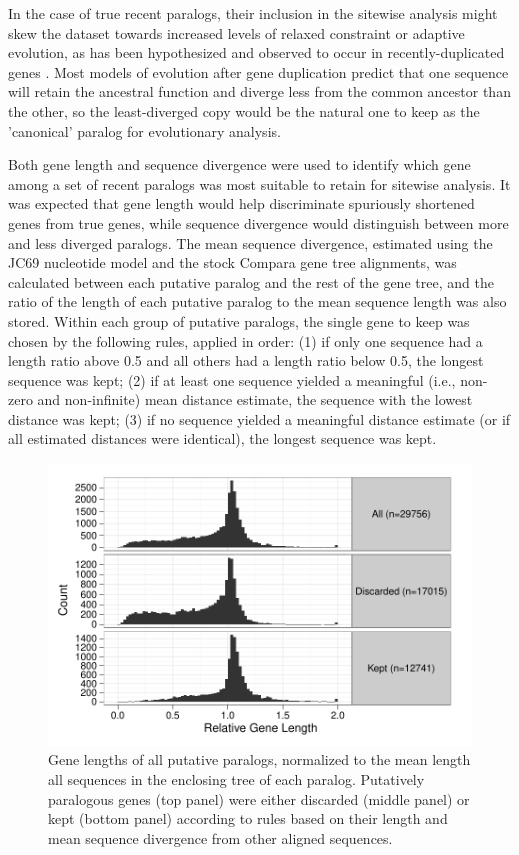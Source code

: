 In the case of true recent paralogs, their inclusion in the sitewise
analysis might skew the dataset towards increased levels of relaxed
constraint or adaptive evolution, as has been hypothesized and
observed to occur in recently-duplicated genes \citep{Lynch2000}. Most
models of evolution after gene duplication predict that one sequence
will retain the ancestral function and diverge less from the common
ancestor than the other, so the least-diverged copy would be the
natural one to keep as the 'canonical' paralog for evolutionary
analysis.

Both gene length and sequence divergence were used to identify which
gene among a set of recent paralogs was most suitable to retain for
sitewise analysis. It was expected that gene length would help
discriminate spuriously shortened genes from true genes, while
sequence divergence would distinguish between more and less diverged
paralogs. The mean sequence divergence, estimated using the JC69
nucleotide model and the stock Compara gene tree alignments, was
calculated between each putative paralog and the rest of the gene
tree, and the ratio of the length of each putative paralog to the mean
sequence length was also stored. Within each group of putative
paralogs, the single gene to keep was chosen by the following rules,
applied in order: (1) if only one sequence had a length ratio above
0.5 and all others had a length ratio below 0.5, the longest sequence
was kept; (2) if at least one sequence yielded a meaningful (i.e.,
non-zero and non-infinite) mean distance estimate, the sequence with
the lowest distance was kept; (3) if no sequence yielded a meaningful
distance estimate (or if all estimated distances were identical), the
longest sequence was kept.

\begin{figure}
\centering
\includegraphics[scale=0.7]{Figs/filtered_paralogs_hist.pdf}
\caption{Gene lengths of all putative paralogs, normalized to the mean
  length all sequences in the enclosing tree of each
  paralog. Putatively paralogous genes (top panel) were either
  discarded (middle panel) or kept (bottom panel) according to rules
  based on their length and mean sequence divergence from other
  aligned sequences.}
\label{filtered_paralogs_hist}
\end{figure}

